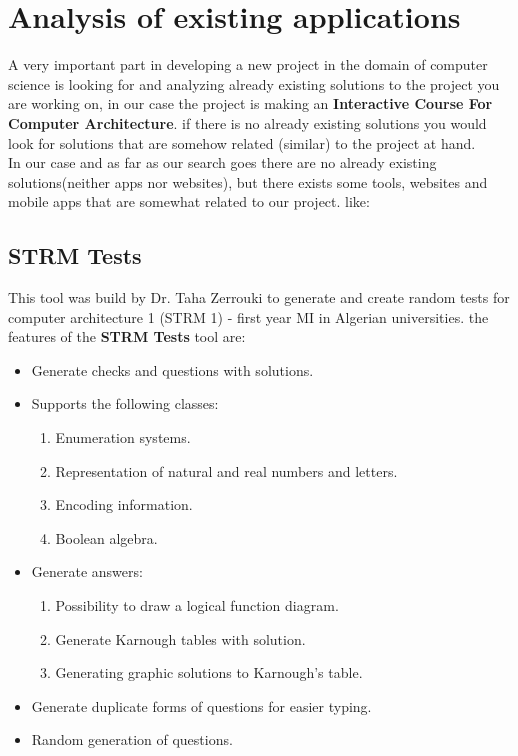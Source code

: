  \section{Analysis of existing applications}
 A very important part in developing a new project in the domain of computer science is looking for and analyzing already
  existing solutions to the project you are working on, in our case the project is making an \textbf{Interactive Course For Computer Architecture}.
  if there is no already existing solutions you would look for solutions that are somehow related (similar) to the project at hand.\\
  In our case and as far as our search goes there are no already existing solutions(neither apps nor websites), but there exists some tools, websites and mobile apps that are somewhat related to our project. like:


 \subsection{STRM Tests }
 This tool was build by  Dr. Taha Zerrouki to generate and create random tests for computer architecture 1 (STRM 1) - first year MI in Algerian universities.\cite{STRM-Tests}
 the features of the \textbf{STRM Tests} tool\cite{STRM-Tests} are:

\begin{itemize}
	\item Generate checks and questions with solutions.
	\item Supports the following classes:
	\begin{enumerate}
		\item Enumeration systems.
		\item Representation of natural and real numbers and letters.
		\item Encoding information.
		\item Boolean algebra.
	\end{enumerate}
	\item Generate answers:
	\begin{enumerate}
		\item Possibility to draw a logical function diagram.
		\item Generate Karnough tables with solution.
		\item Generating graphic solutions to Karnough's table.
	\end{enumerate}
	\item Generate duplicate forms of questions for easier typing.
	\item Random generation of questions.
\end{itemize}

